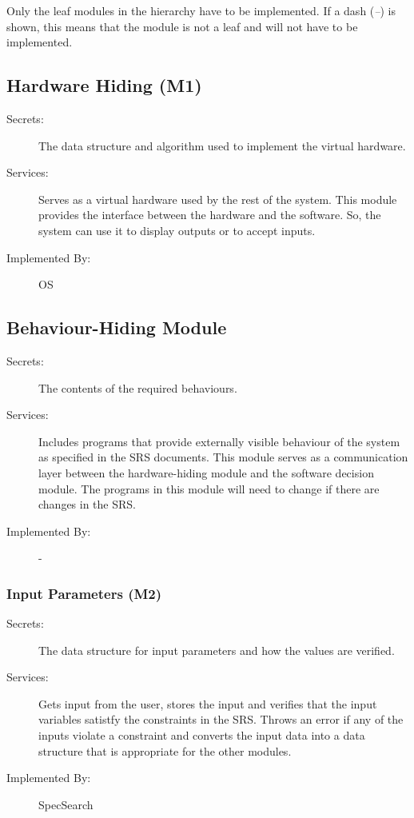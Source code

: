 \documentclass[12pt, titlepage]{article}
\begin{document}
	Only the leaf modules in the hierarchy have to be implemented. If a dash
	(\emph{--}) is shown, this means that the module is not a leaf and will not 
	have
	to be implemented.
	
	
	\subsection{Hardware Hiding (M1)}
	
	\begin{description}
		\item[Secrets:]The data structure and algorithm used to implement the 
		virtual
		hardware.
		\item[Services:]Serves as a virtual hardware used by the rest of the
		system. This module provides the interface between the hardware and the
		software. So, the system can use it to display outputs or to accept 
		inputs.
		\item[Implemented By:] OS
	\end{description}
	
	\subsection{Behaviour-Hiding Module }
	
	\begin{description}
		\item[Secrets:]The contents of the required behaviours.
		\item[Services:]Includes programs that provide externally visible 
		behaviour of
		the system as specified in the SRS
		documents. This module serves as a communication layer between the
		hardware-hiding module and the software decision module. The programs 
		in this
		module will need to change if there are changes in the SRS.
		\item[Implemented By:] -
	\end{description}
	
	\subsubsection{Input Parameters (M2)}
	
	\begin{description}
		\item[Secrets:] The data structure for input parameters and how the 
		values 
		are verified. 
		\item[Services:] Gets input from the user, stores the input and 
		verifies 
		that 
		the input variables satistfy  the constraints in the 
		SRS. Throws an error if 
		any of 
		the inputs violate a constraint and converts the input data into a data 
		structure that is 
		appropriate for the other 
		modules. 
		\item[Implemented By:]SpecSearch 
	\end{description} 
	
\end{document}
